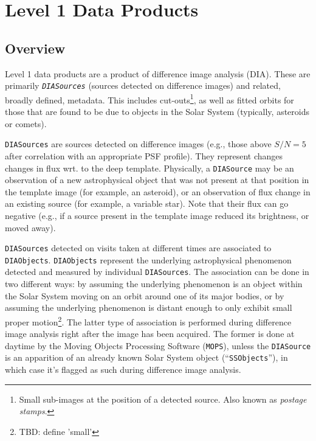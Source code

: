 \documentclass[12pt]{article}
\newcommand{\code}[1]{\texttt{#1}}
\newcommand{\DIASource}{\code{DIASource}\xspace}
\newcommand{\DIASources}{\code{DIASources}\xspace}
\newcommand{\DIAObjects}{\code{DIAObjects}\xspace}
\newcommand{\SSObjects}{\code{SSObjects}\xspace}
\begin{document}

\section{Level 1 Data Products}

\subsection{Overview}

Level 1 data products are a product of difference image analysis (DIA). These are primarily {\em \DIASources} (sources detected on difference images) and related, broadly defined, metadata. This includes cut-outs\footnote{Small sub-images at the position of a detected source. Also known as {\em postage stamps}.}, as well as fitted orbits for those that are found to be due to objects in the Solar System (typically, asteroids or comets).

\DIASources are sources detected on difference images (e.g., those above $S/N=5$ after correlation with an appropriate PSF profile). They represent changes changes in flux wrt. to the deep template. Physically, a \DIASource may be an observation of a new astrophysical object that was not present at that position in the template image (for example, an asteroid), or an observation of flux change in an existing source (for example, a variable star). Note that their flux can go negative (e.g., if a source present in the template image reduced its brightness, or moved away).

\DIASources detected on visits taken at different times are associated to \DIAObjects. \DIAObjects represent the underlying astrophysical phenomenon detected and measured by individual \DIASources. The association can be done in two different ways: by assuming the underlying phenomenon is an object within the Solar System moving on an orbit around one of its major bodies, or by assuming the underlying phenomenon is distant enough to only exhibit small proper motion\footnote{TBD: define 'small'}. The latter type of association is performed during difference image analysis right after the image has been acquired. The former is done at daytime by the Moving Objects Processing Software (\code{MOPS}), unless the \DIASource is an apparition of an already known Solar System object (``\SSObjects''), in which case it's flagged as such during difference image analysis.
\end{document}

